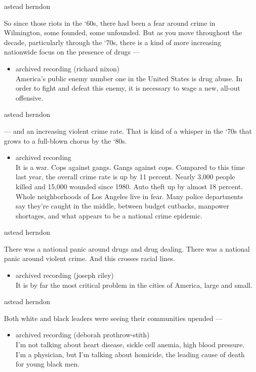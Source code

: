 astead herndon

So since those riots in the `60s, there had been a fear around crime in
Wilmington, some founded, some unfounded. But as you move throughout the
decade, particularly through the `70s, there is a kind of more
increasing nationwide focus on the presence of drugs ---

\begin{itemize}
\tightlist
\item
  archived recording (richard nixon)\\
  America's public enemy number one in the United States is drug abuse.
  In order to fight and defeat this enemy, it is necessary to wage a
  new, all-out offensive.
\end{itemize}

astead herndon

--- and an increasing violent crime rate. That is kind of a whisper in
the `70s that grows to a full-blown chorus by the `80s.

\begin{itemize}
\tightlist
\item
  archived recording\\
  It is a war. Cops against gangs. Gangs against cops. Compared to this
  time last year, the overall crime rate is up by 11 percent. Nearly
  3,000 people killed and 15,000 wounded since 1980. Auto theft up by
  almost 18 percent. Whole neighborhoods of Los Angeles live in fear.
  Many police departments say they're caught in the middle, between
  budget cutbacks, manpower shortages, and what appears to be a national
  crime epidemic.
\end{itemize}

astead herndon

There was a national panic around drugs and drug dealing. There was a
national panic around violent crime. And this crosses racial lines.

\begin{itemize}
\tightlist
\item
  archived recording (joseph riley)\\
  It is by far the most critical problem in the cities of America, large
  and small.
\end{itemize}

astead herndon

Both white and black leaders were seeing their communities upended ---

\begin{itemize}
\tightlist
\item
  archived recording (deborah prothrow-stith)\\
  I'm not talking about heart disease, sickle cell anemia, high blood
  pressure. I'm a physician, but I'm talking about homicide, the leading
  cause of death for young black men.
\end{itemize}

